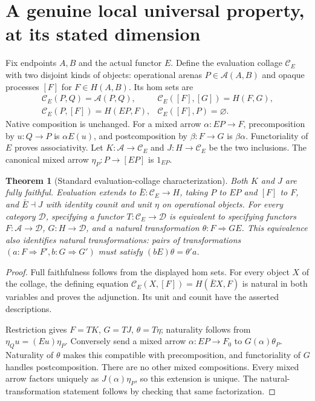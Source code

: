 \documentclass{article}
\newtheorem{theorem}{Theorem}
\begin{document}
\section{A genuine local universal property, at its stated dimension}
Fix endpoints $A,B$ and the actual functor $E$. Define the evaluation
collage $\mathcal C_E$ with two disjoint kinds of objects: operational arenas
$P\in\mathcal A(A,B)$ and opaque processes $[F]$ for $F\in H(A,B)$.
Its hom sets are
\[
\begin{array}{ll}
\mathcal C_E(P,Q)=\mathcal A(P,Q),&
\mathcal C_E([F],[G])=H(F,G),\\
\mathcal C_E(P,[F])=H(EP,F),&
\mathcal C_E([F],P)=\varnothing.
\end{array}
\]
Native composition is unchanged. For a mixed arrow $\alpha:EP\to F$,
precomposition by $u:Q\to P$ is $\alpha E(u)$, and postcomposition by
$\beta:F\to G$ is $\beta\alpha$. Functoriality of $E$ proves associativity.
Let $K:\mathcal A\to\mathcal C_E$ and $J:H\to\mathcal C_E$ be the two
inclusions. The canonical mixed arrow $\eta_P:P\to[EP]$ is $1_{EP}$.

\begin{theorem}[Standard evaluation-collage characterization]
Both $K$ and $J$ are fully faithful. Evaluation extends to
$\bar E:\mathcal C_E\to H$, taking $P$ to $EP$ and $[F]$ to $F$, and
$\bar E\dashv J$ with identity counit and unit $\eta$ on operational
objects. For every category $\mathcal D$, specifying a functor
$T:\mathcal C_E\to\mathcal D$ is equivalent to specifying functors
$F:\mathcal A\to\mathcal D$, $G:H\to\mathcal D$, and a natural
transformation $\theta:F\Rightarrow GE$.
This equivalence also identifies natural transformations: pairs of
transformations $(a:F\Rightarrow F',b:G\Rightarrow G')$ must satisfy
$(bE)\theta=\theta'a$.
\end{theorem}
\begin{proof}
Full faithfulness follows from the displayed hom sets. For every object $X$
of the collage, the defining equation
$\mathcal C_E(X,[F])=H(\bar EX,F)$ is natural in both variables and proves
the adjunction. Its unit and counit have the asserted descriptions.

Restriction gives $F=TK$, $G=TJ$, $\theta=T\eta$; naturality follows from
$\eta_Q u=(Eu)\eta_P$. Conversely send a mixed arrow $\alpha:EP\to F_0$
to $G(\alpha)\theta_P$. Naturality of $\theta$ makes this compatible with
precomposition, and functoriality of $G$ handles postcomposition. There are
no other mixed compositions. Every mixed arrow factors uniquely as
$J(\alpha)\eta_P$, so this extension is unique. The natural-transformation
statement follows by checking that same factorization.
\end{proof}
\end{document}
